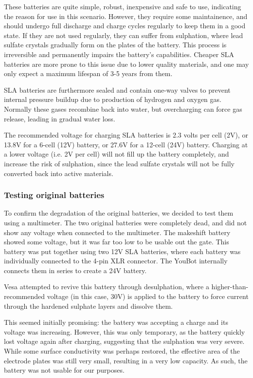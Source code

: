 \documentclass[a4paper, 12pt]{article}
\begin{document}
    These batteries are quite simple, robust, inexpensive and safe to use, indicating the reason for use in this scenario. However, they require some maintainence, and should undergo full discharge and charge cycles regularly to keep them in a good state. If they are not used regularly, they can suffer from sulphation, where lead sulfate crystals gradually form on the plates of the battery. This process is irreversible and permanently impairs the battery's capabilities. Cheaper SLA batteries are more prone to this issue due to lower quality materials, and one may only expect a maximum lifespan of 3-5 years from them. 

    SLA batteries are furthermore sealed and contain one-way valves to prevent internal pressure buildup due to production of hydrogen and oxygen gas. Normally these gases recombine back into water, but overcharging can force gas release, leading in gradual water loss. 

    The recommended voltage for charging SLA batteries is 2.3 volts per cell (2V), or 13.8V for a 6-cell (12V) battery, or 27.6V for a 12-cell (24V) battery. Charging at a lower voltage (i.e. 2V per cell) will not fill up the battery completely, and increase the risk of sulphation, since the lead sulfate crystals will not be fully converted back into active materials. 

    \subsubsection{Testing original batteries}

    To confirm the degradation of the original batteries, we decided to test them using a multimeter. The two original batteries were completely dead, and did not show any voltage when connected to the multimeter. The makeshift battery showed some voltage, but it was far too low to be usable out the gate. This battery was put together using two 12V SLA batteries, where each battery was individually connected to the 4-pin XLR connector. The YouBot internally connects them in series to create a 24V battery.   
    
    Vesa attempted to revive this battery through desulphation, where a higher-than-recommended voltage (in this case, 30V) is applied to the battery to force current through the hardened sulphate layers and dissolve them. 

    This seemed initially promising: the battery was accepting a charge and its voltage was increasing. However, this was only temporary, as the battery quickly lost voltage again after charging, suggesting that the sulphation was very severe. While some surface conductivity was perhaps restored, the effective area of the electrode plates was still very small, resulting in a very low capacity. As such, the battery was not usable for our purposes.  
\end{document}
